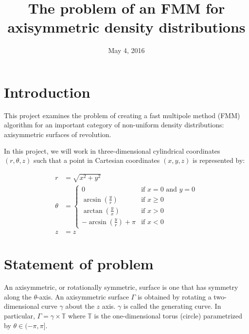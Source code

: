 \documentclass[11pt, oneside]{article}   	%
\title{The problem of an FMM for axisymmetric density distributions}
\date{May 4, 2016}
\begin{document}
\maketitle

\section{Introduction}
This project examines the problem of creating a fast multipole method (FMM) algorithm for an important category of non-uniform density distributions: axisymmetric surfaces of revolution.

In this project, we will work in three-dimensional cylindrical coordinates $(r,\theta,z)$ such that a point in Cartesian coordinates $(x,y,z)$ is represented by:

\begin{align}
r &= \sqrt{x^2+y^2}\\
\theta &=   \begin{cases}
    0 & \mbox{if } x = 0 \mbox{ and } y = 0\\
    \arcsin(\frac{y}{r}) & \mbox{if } x \geq 0 \\	
    \arctan(\frac{y}{x}) & \mbox{if } x > 0 \\	
    -\arcsin(\frac{y}{r}) + \pi & \mbox{if } x < 0
  \end{cases}\\
z &= z
\end{align}

\section{Statement of problem}

An axisymmetric, or rotationally symmetric, surface is one that has symmetry along the $\theta$-axis. An axisymmetric surface $\Gamma$ is obtained by rotating a two-dimensional curve $\gamma$ about the $z$ axis. $\gamma$ is called the generating curve. In particular, $\Gamma=\gamma\times\mathbb{T}$ where $\mathbb{T}$ is the one-dimensional torus (circle) parametrized by $\theta\in(-\pi,\pi]$.
\end{document}
